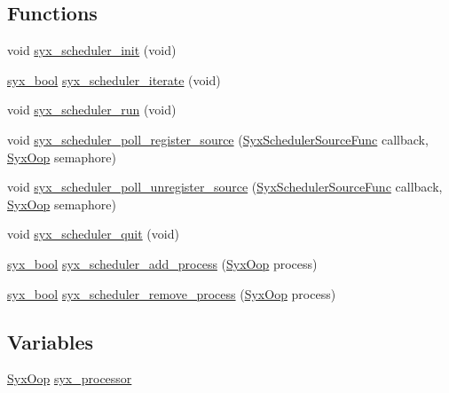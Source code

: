 \subsection*{Functions}
\begin{CompactItemize}
\item 
void \hyperlink{syx-scheduler_8c_826bd9cb537fa7b575471e55d4a22096}{syx\_\-scheduler\_\-init} (void)
\item 
\hyperlink{syx-types_8h_c6dc09b276b99fa1956364359139daab}{syx\_\-bool} \hyperlink{syx-scheduler_8c_f057361452bd4dc5c068977fbeed3930}{syx\_\-scheduler\_\-iterate} (void)
\item 
void \hyperlink{syx-scheduler_8c_b2a6b8c50609209c4ce77e0ee93ad15c}{syx\_\-scheduler\_\-run} (void)
\item 
void \hyperlink{syx-scheduler_8c_55fca0fb039850c253fbb76132099c19}{syx\_\-scheduler\_\-poll\_\-register\_\-source} (\hyperlink{syx-scheduler_8h_6c2e31a7f026cdd3d5eb1fc0d263c63a}{SyxSchedulerSourceFunc} callback, \hyperlink{syx-types_8h_1121caba2d40b2ce090b640762744ccd}{SyxOop} semaphore)
\item 
void \hyperlink{syx-scheduler_8c_3f55059f958063f4332db465abe11958}{syx\_\-scheduler\_\-poll\_\-unregister\_\-source} (\hyperlink{syx-scheduler_8h_6c2e31a7f026cdd3d5eb1fc0d263c63a}{SyxSchedulerSourceFunc} callback, \hyperlink{syx-types_8h_1121caba2d40b2ce090b640762744ccd}{SyxOop} semaphore)
\item 
void \hyperlink{syx-scheduler_8c_4a871e11c8c343aee6d766dab4b59383}{syx\_\-scheduler\_\-quit} (void)
\item 
\hyperlink{syx-types_8h_c6dc09b276b99fa1956364359139daab}{syx\_\-bool} \hyperlink{syx-scheduler_8c_a79a002ea5114a6fbdea9d617e6b75e5}{syx\_\-scheduler\_\-add\_\-process} (\hyperlink{syx-types_8h_1121caba2d40b2ce090b640762744ccd}{SyxOop} process)
\item 
\hyperlink{syx-types_8h_c6dc09b276b99fa1956364359139daab}{syx\_\-bool} \hyperlink{syx-scheduler_8c_5eed9263555dd5245c7ab05cdf59d995}{syx\_\-scheduler\_\-remove\_\-process} (\hyperlink{syx-types_8h_1121caba2d40b2ce090b640762744ccd}{SyxOop} process)
\end{CompactItemize}
\subsection*{Variables}
\begin{CompactItemize}
\item 
\hyperlink{syx-types_8h_1121caba2d40b2ce090b640762744ccd}{SyxOop} \hyperlink{syx-scheduler_8c_cd76972884d834c2095b727889851064}{syx\_\-processor}
\end{CompactItemize}


